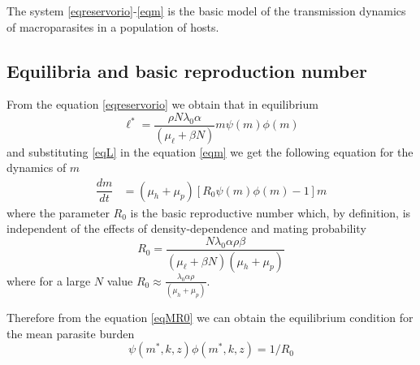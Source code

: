 \documentclass[12pt,a4paper]{article}
\theoremstyle{plain}%
\theoremstyle{definition}
\theoremstyle{remark}
\begin{document}
	The system \eqref{eqreservorio}-\eqref{eqm} is the basic model of the transmission dynamics of macroparasites in a population of hosts. 






\subsection{Equilibria and basic reproduction number}
	From the equation \eqref{eqreservorio} we obtain that in equilibrium
	\begin{equation}\label{eqL}
		\ell^*=\frac{\rho N \lambda_0 \alpha}{(\mu_{\ell}+\beta N)} m \psi(m)\phi(m) 
	\end{equation} 
	and substituting \eqref{eqL} in the equation \eqref{eqm} we get the following equation for the dynamics of $m$
	\begin{align}\label{eqMR0}
		\dfrac{dm}{dt}&=(\mu_h + \mu_p)\left[ R_0  \psi(m)\phi(m) -1 \right] m%
	\end{align}
	where the parameter $R_0$ is the basic reproductive number which, by definition, is independent of the effects of density-dependence and  mating probability
	\begin{equation}\label{valorR0}
	R_0=\frac{ N \lambda_0 \alpha  \rho \beta}{ (\mu_{\ell}+\beta N) (\mu_h + \mu_p) }
	\end{equation}
	where for a large $N$ value $R_0\approx \frac{ \lambda_0 \alpha  \rho }{ (\mu_h + \mu_p) }$.
	
	
	
	
	
	Therefore from the equation \eqref{eqMR0} we can obtain the equilibrium condition for the mean parasite burden
	\begin{equation}\label{eqequilibrio}
	\psi(m^*,k,z)\phi(m^*,k,z)=1/R_0
	\end{equation}
	
\end{document}
